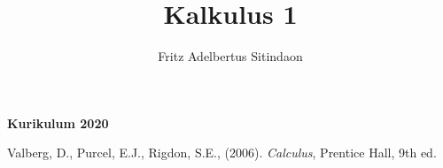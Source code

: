 \documentclass{article}
\title{Kalkulus 1}
\author{Fritz Adelbertus Sitindaon}
\date{}
\newcommand{\ds}{\displaystyle}
\begin{document}
\begin{center}
    \textbf{}

    \vspace{0.5cm}
    \textbf{\Large Kurikulum 2020}

    \vspace{7cm}
    \scalebox{15}{$\ds \lim_{x \to \infty}$}
\end{center}
\thispagestyle{empty}
\newpage
\tableofcontents














\begin{thebibliography}{9}
Valberg, D., Purcel, E.J., Rigdon, S.E., (2006). \emph{Calculus}, Prentice Hall, 9th ed.
\end{thebibliography}
\end{document}
